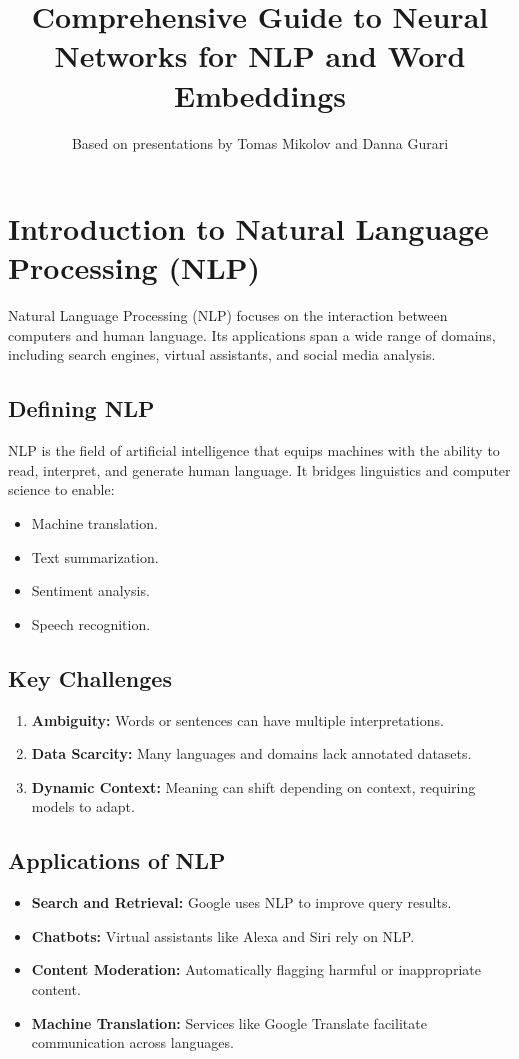 \documentclass[12pt]{article}
\title{Comprehensive Guide to Neural Networks for NLP and Word Embeddings}
\author{Based on presentations by Tomas Mikolov and Danna Gurari}
\date{}
\begin{document}
\maketitle

\tableofcontents
\newpage

\section{Introduction to Natural Language Processing (NLP)}
Natural Language Processing (NLP) focuses on the interaction between computers and human language. Its applications span a wide range of domains, including search engines, virtual assistants, and social media analysis.

\subsection{Defining NLP}
NLP is the field of artificial intelligence that equips machines with the ability to read, interpret, and generate human language. It bridges linguistics and computer science to enable:
\begin{itemize}
    \item Machine translation.
    \item Text summarization.
    \item Sentiment analysis.
    \item Speech recognition.
\end{itemize}

\subsection{Key Challenges}
\begin{enumerate}
    \item \textbf{Ambiguity:} Words or sentences can have multiple interpretations.
    \item \textbf{Data Scarcity:} Many languages and domains lack annotated datasets.
    \item \textbf{Dynamic Context:} Meaning can shift depending on context, requiring models to adapt.
\end{enumerate}

\subsection{Applications of NLP}
\begin{itemize}
    \item \textbf{Search and Retrieval:} Google uses NLP to improve query results.
    \item \textbf{Chatbots:} Virtual assistants like Alexa and Siri rely on NLP.
    \item \textbf{Content Moderation:} Automatically flagging harmful or inappropriate content.
    \item \textbf{Machine Translation:} Services like Google Translate facilitate communication across languages.
\end{itemize}
\end{document}

